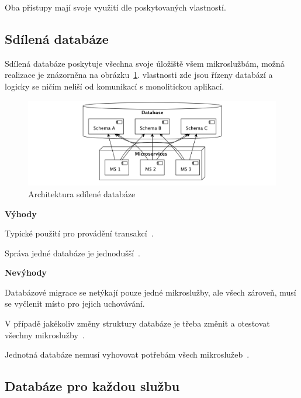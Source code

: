 Oba přístupy mají svoje využití dle poskytovaných vlastností.



\subsection{Sdílená databáze}\label{subsec:shared-db}

Sdílená databáze poskytuje všechna svoje úložiště všem mikroslužbám, možná realizace je znázorněna na obrázku~\ref{fig:db-shared}.  vlastnosti zde jsou řízeny databází a logicky se ničím neliší od komunikací s monolitickou aplikací.

\begin{figure}[htbp]
   \centering
   \includegraphics[max width=\textwidth]{assets/db-shared}
   \caption{Architektura sdílené databáze}\label{fig:db-shared}
\end{figure}

\textbf{Výhody}
\begin{ul}
   \item Typické použití  pro provádění transakcí~\cite{shareddb}.
   \item Správa jedné databáze je jednodušší~\cite{shareddb}.
\end{ul}

\textbf{Nevýhody}
\begin{ul}
   \item Databázové migrace se netýkají pouze jedné mikroslužby, ale všech zároveň, musí se vyčlenit místo pro jejich uchovávání.
   \item V případě jakékoliv změny struktury databáze je třeba změnit a otestovat všechny mikroslužby~\cite{shareddb}.
   \item Jednotná databáze nemusí vyhovovat potřebám všech mikroslužeb~\cite{shareddb}.
\end{ul}



\subsection{Databáze pro každou službu}\label{subsec:msa-db-per-service}

